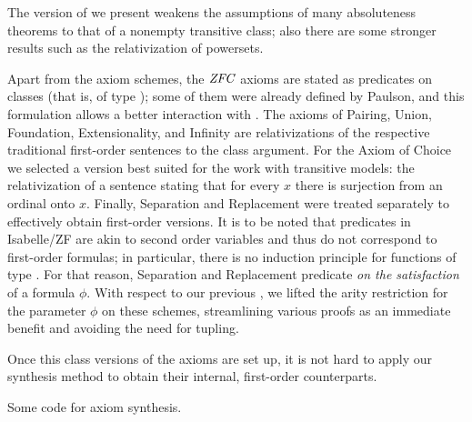 The version of  we present weakens the
assumptions of many absoluteness theorems to that
of a nonempty transitive class; also there are some stronger results
such as the relativization of powersets.

Apart from the axiom schemes, the $\mathit{ZFC}$ 
axioms are stated as predicates on classes (that is,
of type ); some
of them were already defined by Paulson, and this formulation allows a
better interaction with . 
The axioms of Pairing, Union, Foundation,
Extensionality, and Infinity are relativizations of the respective
traditional 
first-order sentences to the class argument. For the Axiom of Choice
we selected a version best suited for the work with transitive
models: the relativization of a sentence stating that for every $x$
there is surjection from an ordinal onto $x$. Finally, Separation and
Replacement were treated separately to effectively obtain first-order
versions. It is to be noted that predicates in Isabelle/ZF are akin to
second order variables and thus do not correspond to first-order
formulas; in particular, there is no induction principle for functions
of type . For that reason, Separation and
Replacement predicate \emph{on the satisfaction} of a formula $\phi$.
With respect to our previous \cite{2019arXiv190103313G}, we lifted the
arity restriction for the parameter $\phi$ on these schemes,
streamlining various proofs as an immediate benefit and avoiding the
need for tupling.

Once this class versions of the axioms are set up, it is not hard to
apply our synthesis method to obtain their internal, first-order
counterparts.
\begin{framed}
  Some code for axiom synthesis.
\end{framed}

